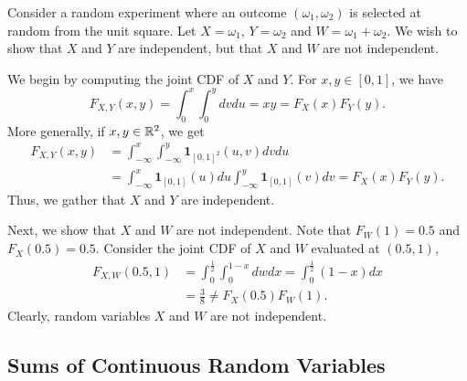 \begin{example}
Consider a random experiment where an outcome $(\omega_1, \omega_2)$ is selected at random from the unit square.
Let $X = \omega_1$, $Y = \omega_2$ and $W = \omega_1 + \omega_2$.
We wish to show that $X$ and $Y$ are independent, but that $X$ and $W$ are not independent.

We begin by computing the joint CDF of $X$ and $Y$.
For $x,y \in [0,1]$, we have
\begin{equation*}
F_{X,Y}(x,y) = \int_0^{x} \int_0^{y} dv du
= x y = F_X(x) F_Y(y) .
\end{equation*}
More generally, if $x, y \in \mathbb{R}^2$, we get
\begin{equation*}
\begin{split}
F_{X,Y}(x,y)
&= \int_{-\infty}^{x} \int_{-\infty}^{y}
\mathbf{1}_{[0,1]^2} (u, v) dv du \\
&= \int_{-\infty}^{x} \mathbf{1}_{[0,1]} (u) du
\int_{-\infty}^{y} \mathbf{1}_{[0,1]} (v) dv
= F_X(x) F_Y(y) .
\end{split}
\end{equation*}
Thus, we gather that $X$ and $Y$ are independent.

Next, we show that $X$ and $W$ are not independent.
Note that $F_W (1) = 0.5$ and $F_X (0.5) = 0.5$.
Consider the joint CDF of $X$ and $W$ evaluated at $(0.5, 1)$,
\begin{equation*}
\begin{split}
F_{X,W} (0.5, 1)
&= \int_{0}^{\frac{1}{2}} \int_{0}^{1-x} dw dx
= \int_{0}^{\frac{1}{2}} (1 - x) dx \\
&= \frac{3}{8}
\neq F_X (0.5) F_W(1) .
\end{split}
\end{equation*}
Clearly, random variables $X$ and $W$ are not independent.
\end{example}


\subsection{Sums of Continuous Random Variables}

